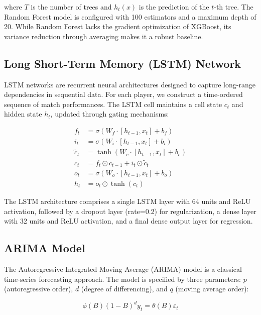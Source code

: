 \documentclass[conference]{IEEEtran}
\begin{document}
where \(T\) is the number of trees and \(h_t(x)\) is the prediction of the \(t\)-th tree. The Random Forest model is configured with 100 estimators and a maximum depth of 20. While Random Forest lacks the gradient optimization of XGBoost, its variance reduction through averaging makes it a robust baseline.

\subsection{Long Short-Term Memory (LSTM) Network}
LSTM networks are recurrent neural architectures designed to capture long-range dependencies in sequential data. For each player, we construct a time-ordered sequence of match performances. The LSTM cell maintains a cell state \(c_t\) and hidden state \(h_t\), updated through gating mechanisms:

\begin{equation}
\begin{aligned}
f_t &= \sigma(W_f \cdot [h_{t-1}, x_t] + b_f) \\
i_t &= \sigma(W_i \cdot [h_{t-1}, x_t] + b_i) \\
\tilde{c}_t &= \tanh(W_c \cdot [h_{t-1}, x_t] + b_c) \\
c_t &= f_t \odot c_{t-1} + i_t \odot \tilde{c}_t \\
o_t &= \sigma(W_o \cdot [h_{t-1}, x_t] + b_o) \\
h_t &= o_t \odot \tanh(c_t)
\end{aligned}
\label{eq:lstm}
\end{equation}

The LSTM architecture comprises a single LSTM layer with 64 units and ReLU activation, followed by a dropout layer (rate=0.2) for regularization, a dense layer with 32 units and ReLU activation, and a final dense output layer for regression.

\subsection{ARIMA Model}
The Autoregressive Integrated Moving Average (ARIMA) model is a classical time-series forecasting approach. The model is specified by three parameters: \(p\) (autoregressive order), \(d\) (degree of differencing), and \(q\) (moving average order):

\begin{equation}
\phi(B)(1-B)^d y_t = \theta(B)\varepsilon_t
\label{eq:arima}
\end{equation}
\end{document}
